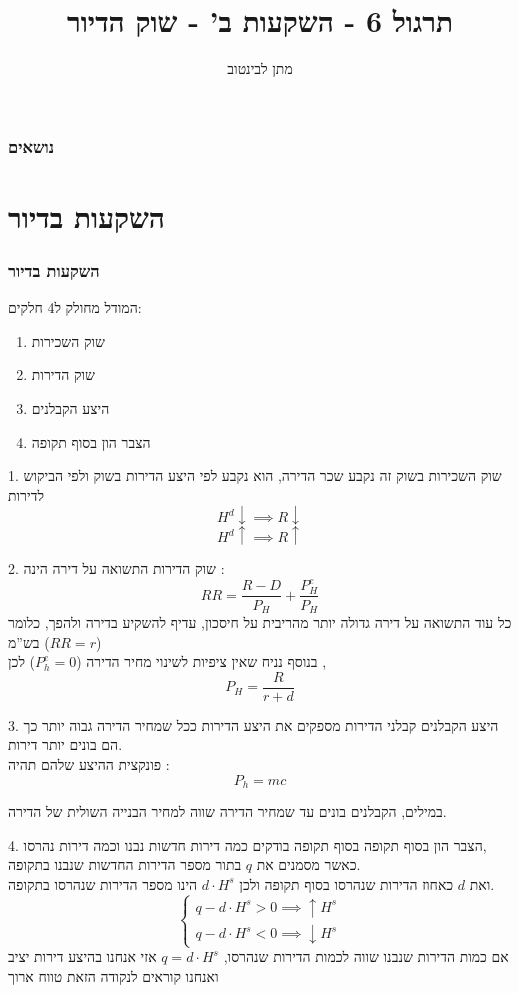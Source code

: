 \documentclass[usenames,dvipsnames, 10pt]{beamer}
\title{תרגול 6 - השקעות ב' - שוק הדיור}
\author{\texthebrew{ מתן לבינטוב}}
\institute[{{ אב"ג}}]{{ אוניברסיטת בן גוריון בנגב}}
\date{}
\begin{document}
\begin{RTL}
\begin{frame}
\titlepage
\end{frame}

\begin{frame}
    \frametitle{נושאים}
    \tableofcontents
\end{frame}

\section{השקעות בדיור}
\begin{frame}[allowframebreaks]
    \frametitle{השקעות בדיור}
המודל מחולק ל4 חלקים: 
\begin{enumerate}
    \item שוק השכירות
    \item שוק הדירות
    \item היצע הקבלנים
    \item הצבר הון בסוף תקופה
\end{enumerate}
    
\framebreak

\begin{block}{1. שוק השכירות}
    בשוק זה נקבע שכר הדירה, הוא נקבע לפי היצע הדירות בשוק ולפי הביקוש לדירות
    $$ H^d \downarrow \implies R \downarrow $$
    $$ H^d \uparrow \implies R \uparrow $$
\end{block}
\framebreak
\begin{block}{2. שוק הדירות}
    התשואה על דירה הינה :
    $$ RR = \frac{R - D }{P_H} + \frac{P_H^{e}}{P_H} $$
    כל עוד התשואה על דירה גדולה יותר מהריבית על חיסכון, עדיף להשקיע בדירה ולהפך, כלומר בש''מ ($RR = r$)
    \\
     בנוסף נניח שאין ציפיות לשינוי מחיר הדירה ($P_h^e = 0 $)
    לכן ,
    $$P_H = \frac{R}{r+d}$$
\end{block}
\framebreak
\begin{block}{3. היצע הקבלנים}
    קבלני הדירות מספקים את היצע הדירות ככל שמחיר הדירה גבוה יותר כך הם בונים יותר דירות.
    \\
    פונקצית ההיצע שלהם תהיה :
    $$P_h = mc $$

    במילים, הקבלנים בונים עד שמחיר הדירה שווה למחיר הבנייה השולית של הדירה.
    
\end{block}

\framebreak
\begin{block}{4. הצבר הון בסוף תקופה}
    בסוף תקופה בודקים כמה דירות חדשות נבנו וכמה דירות נהרסו, \\ 
    כאשר מסמנים את $q$ בתור מספר הדירות החדשות שנבנו בתקופה.\\
    ואת $d$ כאחוז הדירות שנהרסו בסוף תקופה ולכן $d \cdot H^s$ הינו מספר הדירות שנהרסו בתקופה.
    $$\begin{cases}
        q - d \cdot H^s > 0 \implies \uparrow H^s \\
        q - d \cdot H^s < 0 \implies \downarrow H^s   
    \end{cases}$$
    אם כמות הדירות שנבנו שווה לכמות הדירות שנהרסו, $q = d\cdot H^s$ אזי אנחנו בהיצע דירות יציב ואנחנו קוראים לנקודה הזאת טווח ארוך
\end{block}


\end{frame}
\end{RTL}
\end{document}
